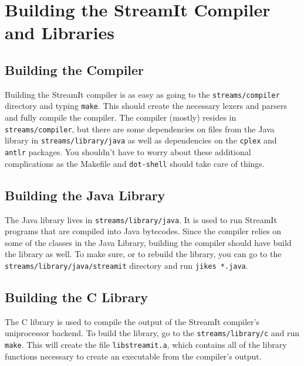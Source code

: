 \section{Building the StreamIt Compiler and Libraries}

\subsection{Building the Compiler}
Building the StreamIt compiler is as easy as
going to the {\tt streams/compiler} directory and typing
{\tt make}. This should create the necessary lexers and
parsers and fully compile the compiler.
The compiler (mostly) resides in {\tt streams/compiler},
but there are some dependencies on files from the Java 
library in {\tt streams/library/java} as well as 
dependencies on the {\tt cplex} and {\tt antlr} packages.
You shouldn't have to worry about these additional complications
as the Makefile and {\tt dot-shell} should take care of things.

\subsection{Building the Java Library}
The Java library lives in {\tt streams/library/java}. It is 
used to run StreamIt programs that are compiled into Java 
bytecodes. Since the compiler relies on some of the classes
in the Java Library, building the compiler should have build
the library as well. To make sure, or to rebuild the library,
you can go to the {\tt streams/library/java/streamit} 
directory and run {\tt jikes *.java}.

\subsection{Building the C Library}
The C library is used to compile the output of the StreamIt
compiler's uniprocessor backend. To build the library, 
go to the {\tt streams/library/c} and run {\tt make}. 
This will create the file {\tt libstreamit.a}, 
which contains all of the library functions necessary to create
an executable from the compiler's output.

